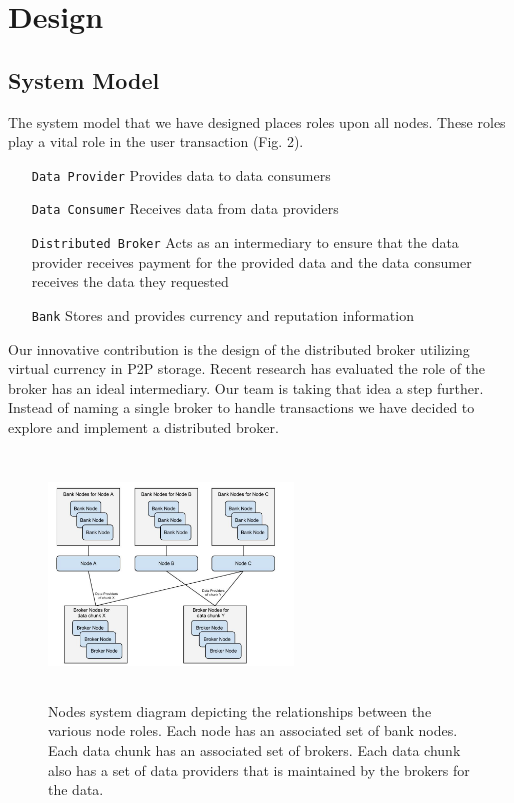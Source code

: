 \documentclass[%
				10pt,
        final,
        notitlepage,
        narroweqnarray,
        inline,
        twoside,
        ]{ieee}
\begin{document}
\section{Design}


\subsection{System Model}
The system model that we have designed places roles upon all nodes.  These roles play a vital role in the user transaction (Fig. 2).
\begin{itemize}
\item[\texttt{Data Provider}] Provides data to data consumers
\item[\texttt{Data Consumer}] Receives data from data providers
\item[\texttt{Distributed Broker}] Acts as an intermediary to ensure that the data provider receives payment for the provided data and the data consumer receives the data they requested
\item[\texttt{Bank}] Stores and provides currency and reputation information
\end{itemize}
Our innovative contribution is the design of the distributed broker utilizing virtual currency in P2P storage.  Recent research has evaluated the role of the broker has an ideal intermediary.  Our team is taking that idea a step further.  Instead of naming a single broker to handle transactions we have decided to explore and implement a distributed broker.

\begin{figure}
  \begin{center}
    \includegraphics[height=65mm,width=65mm]{graphics/NodesSystemDiagram.jpg}
  \caption{Nodes system diagram depicting the relationships between the various node roles.  Each node has an associated set of bank nodes.  Each data chunk has an associated set of brokers.  Each data chunk also has a set of data providers that is maintained by the brokers for the data.
}
  \end{center}
\end{figure}
\end{document}
